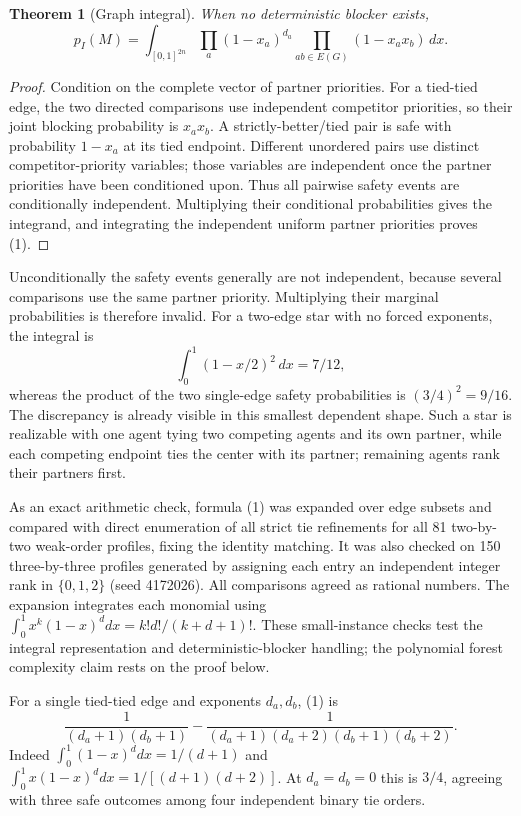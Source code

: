\documentclass[11pt,a4paper]{article}
\newtheorem{theorem}{Theorem}[section]
\begin{document}
\begin{theorem}[Graph integral]
When no deterministic blocker exists,
\[
 p_I(M)=\int_{[0,1]^{2n}}
       \prod_a(1-x_a)^{d_a}
       \prod_{ab\in E(G)}(1-x_ax_b)\,dx.                  \tag{1}
\]
\end{theorem}
\begin{proof}
Condition on the complete vector of partner priorities. For a tied-tied edge, the two directed comparisons use independent competitor priorities, so their joint blocking probability is $x_ax_b$. A strictly-better/tied pair is safe with probability $1-x_a$ at its tied endpoint. Different unordered pairs use distinct competitor-priority variables; those variables are independent once the partner priorities have been conditioned upon. Thus all pairwise safety events are conditionally independent. Multiplying their conditional probabilities gives the integrand, and integrating the independent uniform partner priorities proves (1).
\end{proof}

Unconditionally the safety events generally are not independent, because several comparisons use the same partner priority. Multiplying their marginal probabilities is therefore invalid. For a two-edge star with no forced exponents, the integral is
\[
 \int_0^1(1-x/2)^2\,dx=7/12,
\]
whereas the product of the two single-edge safety probabilities is $(3/4)^2=9/16$. The discrepancy is already visible in this smallest dependent shape. Such a star is realizable with one agent tying two competing agents and its own partner, while each competing endpoint ties the center with its partner; remaining agents rank their partners first.

As an exact arithmetic check, formula (1) was expanded over edge subsets and compared with direct enumeration of all strict tie refinements for all 81 two-by-two weak-order profiles, fixing the identity matching. It was also checked on 150 three-by-three profiles generated by assigning each entry an independent integer rank in $\{0,1,2\}$ (seed 4172026). All comparisons agreed as rational numbers. The expansion integrates each monomial using
$\int_0^1x^k(1-x)^d dx=k!d!/(k+d+1)!$.
These small-instance checks test the integral representation and deterministic-blocker handling; the polynomial forest complexity claim rests on the proof below.

For a single tied-tied edge and exponents $d_a,d_b$, (1) is
\[
 \frac1{(d_a+1)(d_b+1)}-
 \frac1{(d_a+1)(d_a+2)(d_b+1)(d_b+2)}.                    \tag{2}
\]
Indeed $\int_0^1(1-x)^d dx=1/(d+1)$ and
$\int_0^1x(1-x)^d dx=1/[(d+1)(d+2)]$. At $d_a=d_b=0$ this is $3/4$, agreeing with three safe outcomes among four independent binary tie orders.
\end{document}
